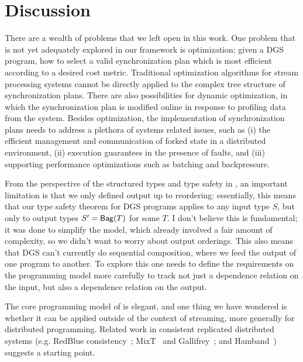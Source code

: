 \section{Discussion}
\label{dgs:sec:conclusion}

There are a wealth of problems that we left open in this work.
One problem that is not yet adequately explored in our framework is optimization:
given a DGS program, how to select a valid synchronization plan which is most efficient according to a desired cost metric.
Traditional optimization algorithms for stream processing systems cannot be directly applied to
the complex tree structure of synchronization plans.
There are also possibilities for
dynamic optimization, in which the synchronization plan is modified online in response to profiling data from the system.
Besides optimization, the implementation of synchronization plans needs to address a plethora of systems related issues, such as (i) the efficient management and communication of forked state in a distributed environment, (ii) execution guarantees in the presence of faults, and (iii) supporting performance optimizations such as batching and backpressure.

From the perspective of the structured types and type safety in ,
an important limitation is that we only defined output up to reordering: essentially, this means that our type safety theorem for DGS programs applies to any input type $S$, but only to output types $S' = \mathsf{Bag}({T})$ for some $T$.
I don't believe this is fundamental; it was done to simplify the model, which already involved a fair amount of complexity, so we didn't want to worry about output orderings.
This also means that DGS can't currently do sequential composition,
where we feed the output of one program to another.
To explore this one needs to define the requirements on the programming model more carefully to track not just a dependence relation on the input, but also a dependence relation on the output.

The core programming model of  is elegant, and one thing we have wondered is whether it can be applied outside of the context of streaming, more generally for distributed programming. Related work in consistent replicated distributed systems
(e.g. RedBlue consistency~\cite{li2012making};
MixT~\cite{milano2018mixt} and Gallifrey~\cite{milano2019tour};
and Hamband~\cite{houshmand2022hamband})
suggests a starting point.
